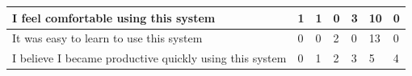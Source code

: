 \begin{center}
{\begin{tabular}{|l|l|l|l|l|l|l|}
I feel comfortable using this system                        & 1                                                            & 1        & 0       & 3     & 10                                                        & 0                                                         \\ \hline
It was easy to learn to use this system                     & 0                                                            & 0        & 2       & 0     & 13                                                        & 0                                                         \\ \hline
I believe I became productive quickly using this system     & 0                                                            & 1        & 2       & 3     & 5                                                         & 4                                                         \\ \hline
\end{tabular}
}
\end{center}
\vspace{1cm}




